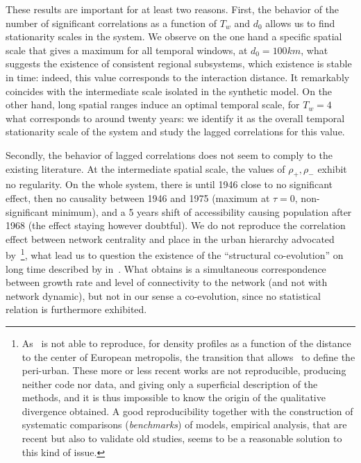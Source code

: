 These results are important for at least two reasons. First, the behavior of the number of significant correlations as a function of $T_w$ and $d_0$ allows us to find stationarity scales in the system. We observe on the one hand a specific spatial scale that gives a maximum for all temporal windows, at $d_0 = 100km$, what suggests the existence of consistent regional subsystems, which existence is stable in time: indeed, this value corresponds to the interaction distance. It remarkably coincides with the intermediate scale isolated in the synthetic model. On the other hand, long spatial ranges induce an optimal temporal scale, for $T_w = 4$ what corresponds to around twenty years: we identify it as the overall temporal stationarity scale of the system and study the lagged correlations for this value.



Secondly, the behavior of lagged correlations does not seem to comply to the existing literature. At the intermediate spatial scale, the values of $\rho_+,\rho_-$ exhibit no regularity. On the whole system, there is until 1946 close to no significant effect, then no causality between 1946 and 1975 (maximum at $\tau = 0$, non-significant minimum), and a 5 years shift of accessibility causing population after 1968 (the effect staying however doubtful). We do not reproduce the correlation effect between network centrality and place in the urban hierarchy advocated by~\cite{bretagnolle2003vitesse}\footnote{As~\cite{lemoy2017scaling} is not able to reproduce, for density profiles as a function of the distance to the center of European metropolis, the transition that allows~\cite{guerois2008built} to define the peri-urban. These more or less recent works are not reproducible, producing neither code nor data, and giving only a superficial description of the methods, and it is thus impossible to know the origin of the qualitative divergence obtained. A good reproducibility together with the construction of systematic comparisons (\emph{benchmarks}) of models, empirical analysis, that are recent but also to validate old studies, seems to be a reasonable solution to this kind of issue.}, what lead us to question the existence of the ``structural co-evolution'' on long time described by  in~\cite{espacegeo2014effets}. What \cite{bretagnolle2003vitesse} obtains is a simultaneous correspondence between growth rate and level of connectivity to the network (and not with network dynamic), but not in our sense a co-evolution, since no statistical relation is furthermore exhibited.



